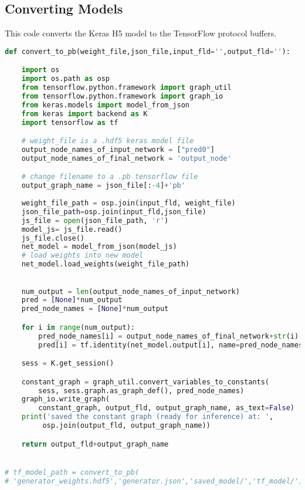 \subsection{Converting Models} %
\label{sub:converting_models}
This code converts the Keras H5 model to the TensorFlow protocol buffers.
\begin{lstlisting}[basicstyle=\scriptsize,language=Python]
def convert_to_pb(weight_file,json_file,input_fld='',output_fld=''):

    import os
    import os.path as osp
    from tensorflow.python.framework import graph_util
    from tensorflow.python.framework import graph_io
    from keras.models import model_from_json
    from keras import backend as K
    import tensorflow as tf

    # weight_file is a .hdf5 keras model file
    output_node_names_of_input_network = ["pred0"] 
    output_node_names_of_final_network = 'output_node'

    # change filename to a .pb tensorflow file
    output_graph_name = json_file[:-4]+'pb'
    
    weight_file_path = osp.join(input_fld, weight_file)
    json_file_path=osp.join(input_fld,json_file)
    js_file = open(json_file_path, 'r')
    model_js= js_file.read()
    js_file.close()
    net_model = model_from_json(model_js)
    # load weights into new model
    net_model.load_weights(weight_file_path)
    

    num_output = len(output_node_names_of_input_network)
    pred = [None]*num_output
    pred_node_names = [None]*num_output

    for i in range(num_output):
        pred_node_names[i] = output_node_names_of_final_network+str(i)
        pred[i] = tf.identity(net_model.output[i], name=pred_node_names[i])

    sess = K.get_session()

    constant_graph = graph_util.convert_variables_to_constants(
        sess, sess.graph.as_graph_def(), pred_node_names)
    graph_io.write_graph(
        constant_graph, output_fld, output_graph_name, as_text=False)
    print('saved the constant graph (ready for inference) at: ',
         osp.join(output_fld, output_graph_name))

    return output_fld+output_graph_name


# tf_model_path = convert_to_pb(
# 'generator_weights.hdf5','generator.json','saved_model/','tf_model/')
\end{lstlisting}
\par\bigskip

